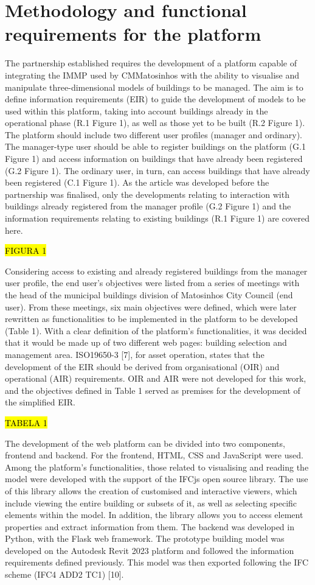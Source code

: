 \section{Methodology and functional requirements for the platform}
\label{sec:methodology}
The partnership established requires the development of a platform capable of integrating the IMMP used by CMMatosinhos with the ability to visualise and manipulate three-dimensional models of buildings to be managed. The aim is to define information requirements (EIR) to guide the development of models to be used within this platform, taking into account buildings already in the operational phase (R.1 Figure 1), as well as those yet to be built (R.2 Figure 1). The platform should include two different user profiles (manager and ordinary). The manager-type user should be able to register buildings on the platform (G.1 Figure 1) and access information on buildings that have already been registered (G.2 Figure 1). The ordinary user, in turn, can access buildings that have already been registered (C.1 Figure 1). As the article was developed before the partnership was finalised, only the developments relating to interaction with buildings already registered from the manager profile (G.2 Figure 1) and the information requirements relating to existing buildings (R.1 Figure 1) are covered here.

\hl{FIGURA 1}

Considering access to existing and already registered buildings from the manager user profile, the end user's objectives were listed from a series of meetings with the head of the municipal buildings division of Matosinhos City Council (end user). From these meetings, six main objectives were defined, which were later rewritten as functionalities to be implemented in the platform to be developed (Table 1). With a clear definition of the platform's functionalities, it was decided that it would be made up of two different web pages: building selection and management area. ISO19650-3 [7], for asset operation, states that the development of the EIR should be derived from organisational (OIR) and operational (AIR) requirements. OIR and AIR were not developed for this work, and the objectives defined in Table 1 served as premises for the development of the simplified EIR.

\hl{TABELA 1}

The development of the web platform can be divided into two components, frontend and backend. For the frontend, HTML, CSS and JavaScript were used. Among the platform's functionalities, those related to visualising and reading the model were developed with the support of the IFCjs open source library. The use of this library allows the creation of customised and interactive viewers, which include viewing the entire building or subsets of it, as well as selecting specific elements within the model. In addition, the library allows you to access element properties and extract information from them. The backend was developed in Python, with the Flask web framework. The prototype building model was developed on the Autodesk Revit 2023 platform and followed the information requirements defined previously. This model was then exported following the IFC scheme (IFC4 ADD2 TC1) [10].